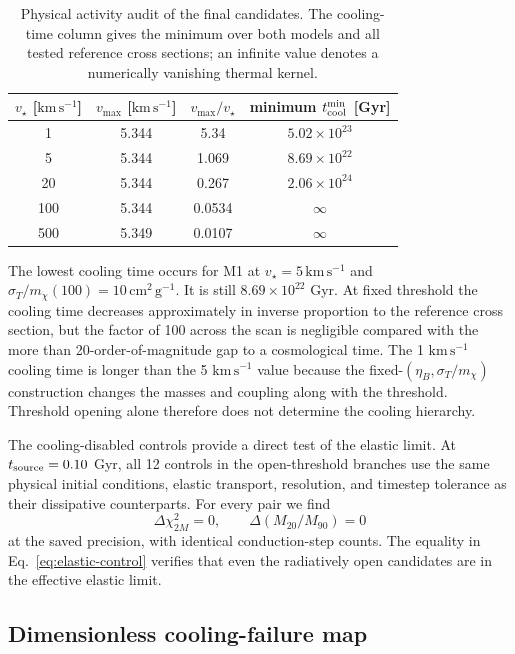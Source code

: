 \documentclass[12pt]{article}
\newcommand{\sigmavm}{\sigma_T/m_\chi}
\newcommand{\vstar}{v_\star}
\newcommand{\tcool}{t_{\rm cool}}
\begin{document}
\begin{table}[t]
\centering
\caption{Physical activity audit of the final candidates.  The cooling-time
column gives the minimum over both models and all tested reference cross
sections; an infinite value denotes a numerically vanishing thermal kernel.}
\label{tab:activity}
\begin{tabular}{cccc}
\toprule
$\vstar$ [$\mathrm{km\,s^{-1}}$] & $v_{\max}$ [$\mathrm{km\,s^{-1}}$] & $v_{\max}/\vstar$ & minimum $\tcool^{\rm min}$ [Gyr]\\
\midrule
1   & 5.344 & 5.34   & $5.02\times10^{23}$\\
5   & 5.344 & 1.069  & $8.69\times10^{22}$\\
20  & 5.344 & 0.267  & $2.06\times10^{24}$\\
100 & 5.344 & 0.0534 & $\infty$\\
500 & 5.349 & 0.0107 & $\infty$\\
\bottomrule
\end{tabular}
\end{table}

The lowest cooling time occurs for M1 at $\vstar=5\,\mathrm{km\,s^{-1}}$ and
$\sigmavm(100)=10\,\mathrm{cm^2\,g^{-1}}$.  It is still
$8.69\times10^{22}$ Gyr.  At fixed threshold the cooling time decreases
approximately in inverse proportion to the reference cross section, but the
factor of 100 across the scan is negligible compared with the more than
20-order-of-magnitude gap to a cosmological time.  The 1
$\mathrm{km\,s^{-1}}$ cooling time is longer than the 5
$\mathrm{km\,s^{-1}}$ value because the fixed-$(\eta_B,\sigmavm)$ construction
changes the masses and coupling along with the threshold.  Threshold opening
alone therefore does not determine the cooling hierarchy.

The cooling-disabled controls provide a direct test of the elastic limit.  At
$t_{\rm source}=0.10$ Gyr, all 12 controls in the open-threshold branches use
the same physical initial conditions, elastic transport, resolution, and
timestep tolerance as their dissipative counterparts.  For every pair we find
\begin{equation}
  \Delta\chi^2_{2M}=0,\qquad
  \Delta(M_{20}/M_{90})=0
  \label{eq:elastic-control}
\end{equation}
at the saved precision, with identical conduction-step counts.  The equality
in Eq.~\eqref{eq:elastic-control} verifies that even the radiatively open
candidates are in the effective elastic limit.

\subsection{Dimensionless cooling-failure map}
\end{document}
